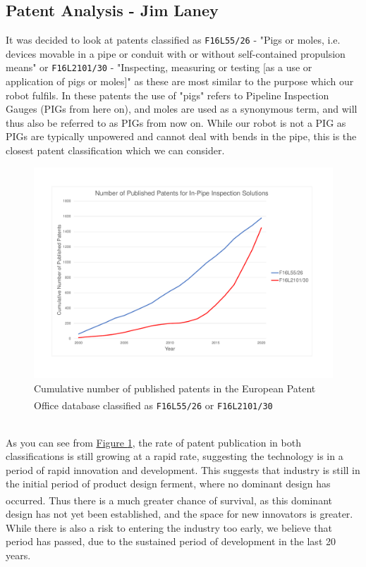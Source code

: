 \documentclass[11pt]{article}		%
\newlength{\imageheight}	 %
\begin{document}
	\subsection[Patent Analysis]{Patent Analysis - Jim Laney}
	
	It was decided to look at patents classified as \verb|F16L55/26| - "Pigs or moles, i.e. devices movable in a pipe or conduit with or without self-contained propulsion means" or \verb|F16L2101/30| - "Inspecting, measuring or testing [as a use or application of pigs or moles]" as these are most similar to the purpose which our robot fulfils.
	In these patents the use of "pigs" refers to Pipeline Inspection Gauges (PIGs from here on), and moles are used as a synonymous term, and will thus also be referred to as PIGs from now on.
	While our robot is not a PIG as PIGs are typically unpowered and cannot deal with bends in the pipe, this is the closest patent classification which we can consider.
	\begin{figure}[h]
			\centering
			\includegraphics[height=\imageheight]{patentGraph}
			\caption{Cumulative number of published patents in the European Patent Office database classified as \texttt{F16L55/26}\textsuperscript{\cite{patent26}} or \texttt{F16L2101/30}\textsuperscript{\cite{patent30}} }
			\label{patentGraph}
	\end{figure}
	\\
	As you can see from \hyperref[patentGraph]{Figure \ref*{patentGraph}}, the rate of patent publication in both classifications is still growing at a rapid rate, suggesting the technology is in a period of rapid innovation and development.
	This suggests that industry is still in the initial period of product design ferment, where no dominant design has occurred\textsuperscript{\cite{christensen1998innovation}}.
	Thus there is a much greater chance of survival, as this dominant design has not yet been established, and the space for new innovators is greater.
	While there is also a risk to entering the industry too early, we believe that period has passed, due to the sustained period of development in the last 20 years.
	
\end{document}

